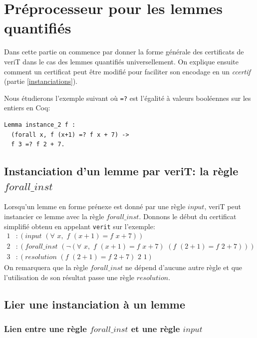 \documentclass[11pt]{article}
\begin{document}
\section{Préprocesseur pour les lemmes quantifiés}

Dans cette partie on commence par donner la forme générale des certificats de veriT dans le cas des lemmes quantifiés universellement. On explique ensuite comment un certificat peut être modifié pour faciliter son encodage en un \textit{ccertif} (partie \ref{instanciations}).\medbreak

Nous étudierons l'exemple suivant où \texttt{=?} est l'égalité à valeurs booléennes sur les entiers en Coq: 

\begin{lstlisting}[frame=single]
Lemma instance_2 f : 
  (forall x, f (x+1) =? f x + 7) ->
  f 3 =? f 2 + 7.
\end{lstlisting}


\subsection{Instanciation d'un lemme par veriT: la règle $forall\_inst$}

Lorsqu'un lemme en forme prénexe est donné par une règle $input$, veriT peut instancier ce lemme avec la règle $forall\_inst$. Donnons le début du certificat simplifié obtenu en appelant \texttt{verit} sur l'exemple:
\begin{align*}
1&:(input \,\,(\forall\,\, x,\,\, f\,\, (x+1) = f\,\,x+7)) \\
2&:(forall\_inst \,\,(\neg (\forall\,\, x, \,\,f \,\,(x+1) = f\,\,x+7) \,\,(f \,\,(2+1) = f\,\,2+7)) )\\
3&:(resolution  \,\, (f \,\,(2+1) = f\,\,2+7) \,\,2 \,\,1) 
\end{align*}
On remarquera que la règle $forall\_inst$ ne dépend d'aucune autre règle et que l'utilisation de son résultat passe une règle $resolution$.

\subsection{Lier une instanciation à un lemme} \label{lien}

\subsubsection{Lien entre une règle $forall\_inst$ et une règle $input$} \label{lien_parsing}
\end{document}
